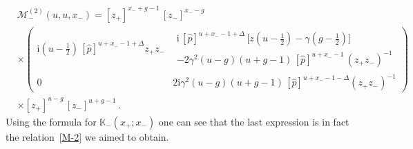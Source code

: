\documentclass[a4paper,11pt]{article}
\renewcommand{\imath}{\mathrm{i}}
\numberwithin{equation}{section}
\begin{document}
\begin{align}
	& \nonumber
	\mathcal{M}^{(2)}_-(u,u,x_-) =
	[z_+]^{x_-+g-1}\,[z_-]^{x_--g} \\
	& \nonumber
	\times
	\left(
	\begin{array}{c|c}
		\imath(u-\frac{1}{2})\,[\hat{p}]^{u+x_--1+\Delta}z_+z_- &
		\begin{array}{l}
			\imath\,[\hat{p}]^{u+x_--1+\Delta}\,\bigl[z(u-\frac{1}{2})-\gamma(g-\frac{1}{2})\bigr] \\
			-2\gamma^2(u-g)(u+g-1)\,[\hat{p}]^{u+x_--1}\,(z_+z_-)^{-1}
		\end{array}
		\\
		\hline
		0 &
		2\imath\gamma^2(u-g)(u+g-1)\,[\hat{p}]^{u+x_--1-\Delta}(z_+z_-)^{-1}
	\end{array}
	\right)\\
	& \nonumber
	\times [z_+]^{u-g}\,[z_-]^{u+g-1} \,.
\end{align}
Using the formula for $\mathbb{K}_-(x_+;x_-)$ one can see that the last expression is in fact the relation~\eqref{M-2} we aimed to obtain.
\end{document}

